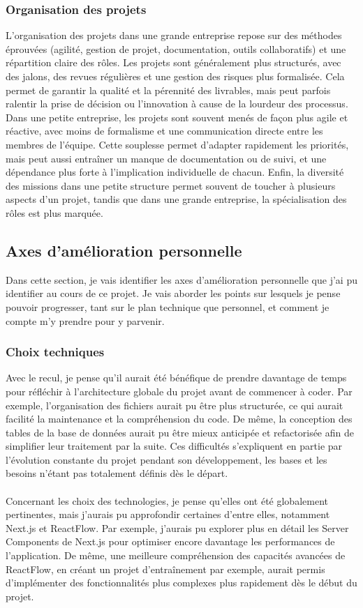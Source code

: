 \documentclass[12pt]{article}
\begin{document}
\subsubsection{Organisation des projets}
L’organisation des projets dans une grande entreprise repose sur des méthodes éprouvées (agilité, gestion de projet, documentation, outils collaboratifs) et une répartition claire des rôles. Les projets sont généralement plus structurés, avec des jalons, des revues régulières et une gestion des risques plus formalisée. Cela permet de garantir la qualité et la pérennité des livrables, mais peut parfois ralentir la prise de décision ou l’innovation à cause de la lourdeur des processus. Dans une petite entreprise, les projets sont souvent menés de façon plus agile et réactive, avec moins de formalisme et une communication directe entre les membres de l’équipe. Cette souplesse permet d’adapter rapidement les priorités, mais peut aussi entraîner un manque de documentation ou de suivi, et une dépendance plus forte à l’implication individuelle de chacun. Enfin, la diversité des missions dans une petite structure permet souvent de toucher à plusieurs aspects d’un projet, tandis que dans une grande entreprise, la spécialisation des rôles est plus marquée.

\subsection{Axes d’amélioration personnelle}
Dans cette section, je vais identifier les axes d'amélioration personnelle que j'ai pu identifier au cours de ce projet. Je vais aborder les points sur lesquels je pense pouvoir progresser, tant sur le plan technique que personnel, et comment je compte m'y prendre pour y parvenir.
\subsubsection{Choix techniques}
Avec le recul, je pense qu’il aurait été bénéfique de prendre davantage de temps pour réfléchir à l’architecture globale du projet avant de commencer à coder. Par exemple, l’organisation des fichiers aurait pu être plus structurée, ce qui aurait facilité la maintenance et la compréhension du code. De même, la conception des tables de la base de données aurait pu être mieux anticipée et refactorisée afin de simplifier leur traitement par la suite. Ces difficultés s’expliquent en partie par l’évolution constante du projet pendant son développement, les bases et les besoins n’étant pas totalement définis dès le départ.
\\\\
Concernant les choix des technologies, je pense qu'elles ont été globalement pertinentes, mais j’aurais pu approfondir certaines d’entre elles, notamment Next.js et ReactFlow. Par exemple, j’aurais pu explorer plus en détail les Server Components de Next.js pour optimiser encore davantage les performances de l’application. De même, une meilleure compréhension des capacités avancées de ReactFlow, en créant un projet d'entraînement par exemple, aurait permis d’implémenter des fonctionnalités plus complexes plus rapidement dès le début du projet.
\end{document}
